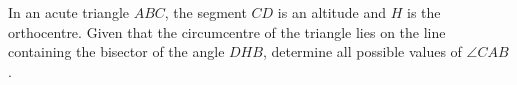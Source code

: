 In an acute triangle $ABC$,  the segment $CD$ is an altitude and $H$ is the orthocentre. Given that the circumcentre of the triangle lies on the line containing the bisector of the angle $DHB$,  determine all possible values of $\angle CAB$.